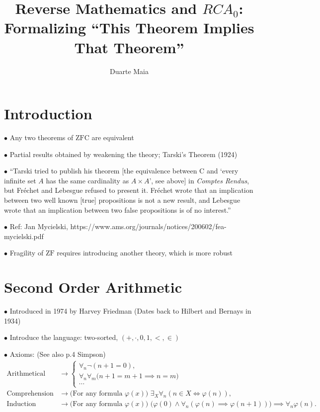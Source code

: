 \documentclass{article}
\title{Reverse Mathematics and $RCA_0$: Formalizing ``This Theorem Implies That Theorem''}
\author{Duarte Maia}
\theoremstyle{nonumberplain}
\newcommand{\ZFC}{\mathrm{ZFC}}
\newcommand{\ZF}{\mathrm{ZF}}
\newcommand{\Choice}{\mathrm{C}}
\newcommand\point[1]{\noindent \hspace{\labelsep} $\bullet$ #1 \smallskip}
\begin{document}
\maketitle

\section{Introduction}

\point{Any two theorems of $\ZFC$ are equivalent}

\point{Partial results obtained by weakening the theory; Tarski's Theorem (1924)}

\point{``Tarski tried to publish his theorem [the equivalence between $\Choice$ and `every infinite set $A$ has the same cardinality as $A \times A$', see above] in \textit{Comptes Rendus}, but Fréchet and Lebesgue refused to present it. Fréchet wrote that an implication between two well known [true] propositions is not a new result, and Lebesgue wrote that an implication between two false propositions is of no interest.''}

\point{Ref: Jan Mycielski, https://www.ams.org/journals/notices/200602/fea-mycielski.pdf}

\point{Fragility of $\ZF$ requires introducing another theory, which is more robust}

\section{Second Order Arithmetic}

\point{Introduced in 1974 by Harvey Friedman (Dates back to Hilbert and Bernays in 1934)}

\point{Introduce the language: two-sorted, $(+,\cdot,0,1,<,\in)$}

\point{Axioms: (See also p.4 Simpson)}
\begin{equation}
\begin{aligned}
\text{Arithmetical Axioms} &\rightarrow \begin{cases}
\forall_n \neg (n+1 = 0),\\
\forall_n \forall_m \big( n+1 = m+1 \implies n=m \big)\\
\cdots
\end{cases}\\
\text{Comprehension} &\rightarrow \text{(For any formula $\varphi(x)$) } \exists_X \forall_n (n \in X \iff \varphi(n)),\\
\text{Induction} &\rightarrow \text{(For any formula $\varphi(x)$) } \big(\varphi(0) \land \forall_n (\varphi(n) \implies \varphi(n+1)) \big) \implies \forall_n \varphi(n).
\end{aligned}
\end{equation}
\end{document}
